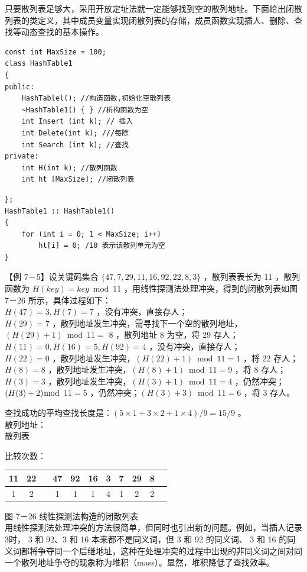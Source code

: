 \documentclass[10pt]{article}
\begin{document}
只要散列表足够大，采用开放定址法就一定能够找到空的散列地址。下面给出闭散列表的类定义，其中成员变量实现闭散列表的存储，成员函数实现插人、删除、查找等动态查找的基本操作。

\begin{verbatim}
const int MaxSize = 100;
class HashTable1
{
public:
    HashTablel(); //构造函数,初姶化空散列表
    ~HashTable1() { } //析构函数为空
    int Insert (int k); // 插入
    int Delete(int k); ///每除
    int Search (int k); //查找
private:
    int H(int k); //散列函数
    int ht [MaxSize]; //闭散列表
\end{verbatim}

\begin{verbatim}
};
HashTable1 :: HashTable1()
{
    for (int i = 0; 1 < MaxSize; i++)
        ht[i] = 0; /10 表示该散列单元为空
}
\end{verbatim}

【例 7－5】设关键码集合 $\{47,7,29,11,16,92,22,8,3\}$ ，散列表表长为 11 ，散列函数为 $H(k e y)=k e y \bmod 11$ ，用线性探测法处理冲突，得到的闭散列表如图 7－26 所示，具体过程如下：\\
$H(47)=3, H(7)=7$ ，没有冲突，直接存人；\\
$H(29)=7$ ，散列地址发生冲突，需寻找下一个空的散列地址，$(H(29)+1) \bmod 11=$ 8 ，散列地址 8 为空，将 29 存人；\\
$H(11)=0, H(16)=5, H(92)=4$ ，没有冲突，直接存人；\\
$H(22)=0$ ，散列地址发生冲突，$(H(22)+1) \bmod 11=1$ ，将 22 存人；\\
$H(8)=8$ ，散列地址发生冲突，$(H(8)+1) \bmod 11=9$ ，将 8 存人；\\
$H(3)=3$ ，散列地址发生冲突，$(H(3)+1) \bmod 11=4$ ，仍然冲突；$(H(3)+2) \bmod$ $11=5$ ，仍然冲突；$(H(3)+3) \bmod 11=6$ ，将 3 存人。

查找成功的平均查找长度是：$(5 \times 1+3 \times 2+1 \times 4) / 9=15 / 9$ 。\\
散列地址：\\
散列表

比较次数： \begin{tabular}{|c|c|c|c|c|c|c|c|c|c|c|}
\hline
11 & 22 &  & 47 & 92 & 16 & 3 & 7 & 29 & 8 &  \\
\hline
1 & 2 &  & 1 & 1 & 1 & 4 & 1 & 2 & 2 &  \\
\hline
\end{tabular}

图 7－26 线性探测法构造的闭散列表\\
用线性探测法处理冲突的方法很简单，但同时也引出新的问题。例如，当插人记录 3时， 3 和 $92 、 3$ 和 16 本来都不是同义词，但 3 和 92 的同义词、 3 和 16 的同义词都将争夺同一个后继地址，这种在处理冲突的过程中出现的非同义词之间对同一个散列地址争夺的现象称为堆积（mass）。显然，堆积降低了查找效率。
\end{document}
